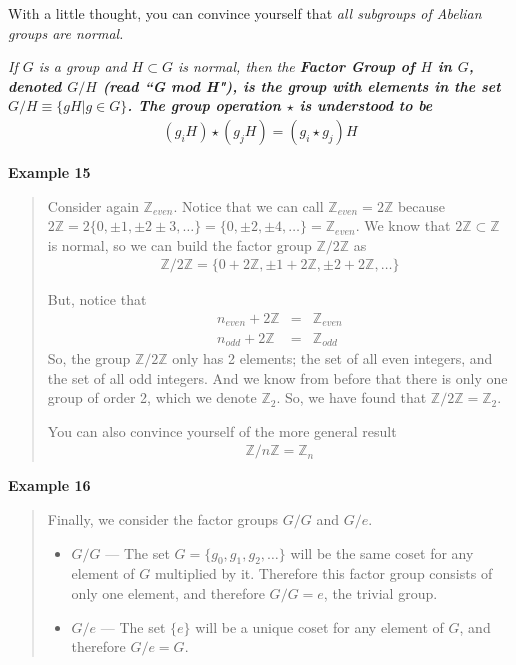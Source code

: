 \documentclass[12pt,epsf]{article}
\def\nolabel{\nonumber }
\def\nolabel{\nonumber }
\begin{document}
With a little thought, you can convince yourself that \it all \rm
subgroups of Abelian groups are normal.  

\it If $G$ is a group and $H \subset G$ is normal, then the \bf Factor
Group \it of $H$ in $G$, denoted $G/H$ (read ``G mod H"), is the group
with elements in the set $G/H \equiv \{gH  | g \in G\}$.  The group
operation $\star$ is understood to be 
\begin{eqnarray}
(g_i H ) \star (g_jH ) = (g_i \star g_j) H \nolabel 
\end{eqnarray}
\newpage

\bf Example 15 \rm
\vspace*{-2ex}
\begin{quote}
Consider again $\mathbb{Z}_{even}$.  Notice that we
can call $\mathbb{Z}_{even} = 2\mathbb{Z}$ because $2\mathbb{Z} = 2\{0,
\pm 1, \pm 2 \pm 3, \ldots\} = \{0, \pm 2, \pm 4, \ldots\} =
\mathbb{Z}_{even}$.  We know that $2\mathbb{Z} \subset \mathbb{Z}$
is normal, so we can build the factor group $\mathbb{Z}/2\mathbb{Z}$ as 
\begin{eqnarray}
\mathbb{Z}/2\mathbb{Z} = \{0+ 2\mathbb{Z}, \pm 1 + 2\mathbb{Z}, \pm 2 +
2\mathbb{Z}, \ldots\} \nolabel 
\end{eqnarray}

But, notice that 
\begin{eqnarray}
n_{even} + 2\mathbb{Z} &=& \mathbb{Z}_{even} \nolabel \\
n_{odd} + 2\mathbb{Z} &=& \mathbb{Z}_{odd} \nolabel 
\end{eqnarray}
So, the group $\mathbb{Z}/2\mathbb{Z}$ only has 2 elements; the set
of all even integers, and the set of all odd integers.	And we know
from before that there is only one group of order 2, which we denote
$\mathbb{Z}_2$.  So, we have found that $\mathbb{Z}/2\mathbb{Z} =
\mathbb{Z}_2$.	

You can also convince yourself of the more general result
\begin{eqnarray}
\mathbb{Z}/n\mathbb{Z} = \mathbb{Z}_n \nolabel 
\end{eqnarray}
\end{quote}
\bf Example 16 \rm
\vspace*{-2ex}
\begin{quote}
Finally, we consider the factor groups
$G/G$ and $G/e$.

\begin{itemize}
\item $G/G$ --- The set $G = \{g_0,g_1,g_2,\ldots\}$ will be the same coset for
any element of $G$ multiplied by it.  Therefore this factor group
consists of only one element, and therefore $G/G = e$, the trivial
group.	

\item $G/e$ --- The set $\{e\}$ will be a unique coset for any element of $G$,
and therefore $G/e = G$.  
\end{itemize}
\end{quote}
\end{document}
